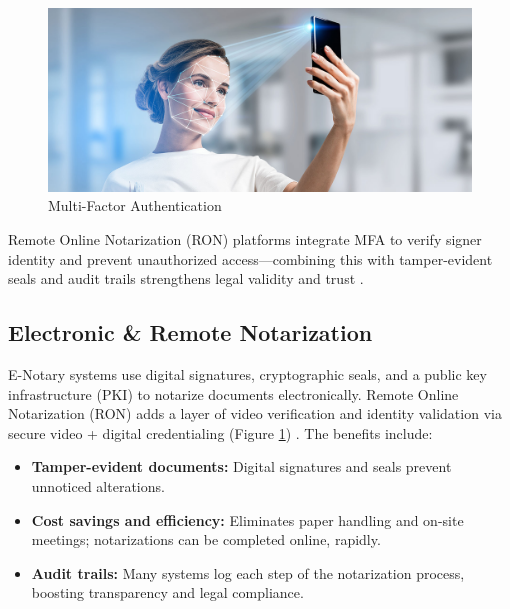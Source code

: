 \begin{figure}[H]
    \centering
    \includegraphics[width=18cm]{"images/multifactor-auth.jpg"}
    \caption{Multi-Factor Authentication}
    \label{multifactor-auth}
\end{figure}

Remote Online Notarization (RON) platforms integrate MFA to verify signer identity and prevent unauthorized access—combining this with tamper-evident seals and audit trails strengthens legal validity and trust \cite{pronotary_how_nodate}.

\subsection{Electronic \& Remote Notarization}
E-Notary systems use digital signatures, cryptographic seals, and a public key infrastructure (PKI) to notarize documents electronically. Remote Online Notarization (RON) adds a layer of video verification and identity validation via secure video + digital credentialing (Figure \ref{multifactor-auth}) \cite{wikipedia_enotary_nodate}. The benefits include:

\begin{itemize}
    \item \textbf{Tamper-evident documents:} Digital signatures and seals prevent unnoticed alterations.
    \item \textbf{Cost savings and efficiency:} Eliminates paper handling and on-site meetings; notarizations can be completed online, rapidly.
    \item \textbf{Audit trails:} Many systems log each step of the notarization process, boosting transparency and legal compliance.
\end{itemize}

